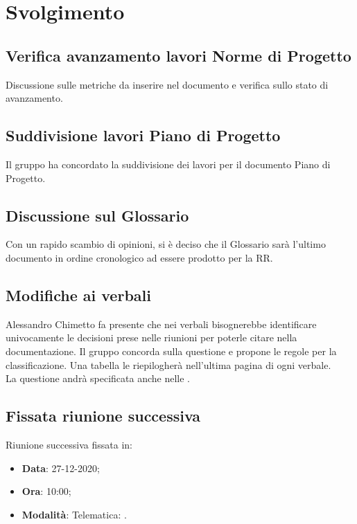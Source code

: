 \documentclass[]{article}
\begin{document}
	\newpage

	\section{Svolgimento}
		\subsection{Verifica avanzamento lavori Norme di Progetto}
		Discussione sulle metriche da inserire nel documento e verifica sullo stato di avanzamento.\\

		\subsection{Suddivisione lavori Piano di Progetto}
		Il gruppo ha concordato la suddivisione dei lavori per il documento Piano di Progetto.\\

		\subsection{Discussione sul Glossario}
		Con un rapido scambio di opinioni, si è deciso che il Glossario sarà l'ultimo documento in ordine cronologico ad essere prodotto per la RR.\\

		\subsection{Modifiche ai verbali}
		Alessandro Chimetto fa presente che nei verbali bisognerebbe identificare univocamente le decisioni prese nelle riunioni per poterle citare nella documentazione. Il gruppo concorda sulla questione e propone le regole per la classificazione. Una tabella le riepilogherà nell'ultima pagina di ogni verbale.\\
		La questione andrà specificata anche nelle .

		\subsection{Fissata riunione successiva}
		Riunione successiva fissata in:
		\begin{itemize}
			\item \textbf{Data}: 27-12-2020;
			\item \textbf{Ora}: 10:00;
			\item \textbf{Modalità}: Telematica: .
		\end{itemize}
	
\end{document}

